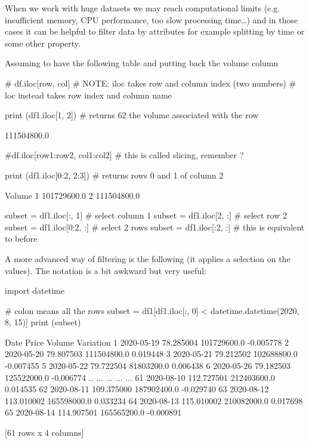 When we work with huge datasets we may reach computational limits (e.g. insufficient memory, CPU performance, too slow processing time\ldots) and in those cases it can be helpful to filter data by attributes for example splitting by time or some other property.

Assuming to have the following table and putting back the volume column

\begin{ipython}
# df.iloc[row, col]
# NOTE: iloc takes row and column index (two numbers)
# loc instead takes row index and column name

print (df1.iloc[1, 2]) # returns 62 the volume associated with the row
\end{ipython}
\begin{ioutput}
111504800.0
\end{ioutput}

\begin{ipython}
#df.iloc[row1:row2, col1:col2]
# this is called slicing, remember ?

print (df1.iloc[0:2, 2:3]) # returns rows 0 and 1 of column 2
\end{ipython}
\begin{ioutput}
        Volume
1  101729600.0
2  111504800.0
\end{ioutput}

\begin{ipython}
subset = df1.iloc[:, 1] # select column 1
subset = df1.iloc[2, :] # select row 2
subset = df1.iloc[0:2, :] # select 2 rows
subset = df1.iloc[:2, :] # this is equivalent to before
\end{ipython}

A more advanced way of filtering is the following (it applies a selection on the values). The notation is a bit awkward but very useful:

\begin{ipython}
import datetime

# colon means all the rows
subset = df1[df1.iloc[:, 0] < datetime.datetime(2020, 8, 15)]
print (subset)
\end{ipython}
\begin{ioutput}
         Date       Price       Volume  Variation
1  2020-05-19   78.285004  101729600.0  -0.005778
2  2020-05-20   79.807503  111504800.0   0.019448
3  2020-05-21   79.212502  102688800.0  -0.007455
5  2020-05-22   79.722504   81803200.0   0.006438
6  2020-05-26   79.182503  125522000.0  -0.006774
..        ...         ...          ...        ...
61 2020-08-10  112.727501  212403600.0   0.014535
62 2020-08-11  109.375000  187902400.0  -0.029740
63 2020-08-12  113.010002  165598000.0   0.033234
64 2020-08-13  115.010002  210082000.0   0.017698
65 2020-08-14  114.907501  165565200.0  -0.000891

[61 rows x 4 columns]
\end{ioutput}

